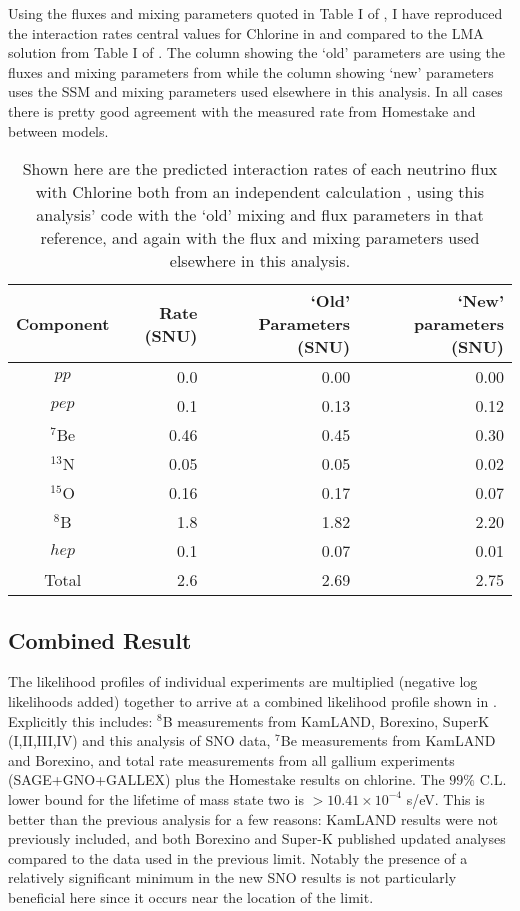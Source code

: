 Using the fluxes and mixing parameters quoted in Table I of \cite{bachall_lma}, I have reproduced the interaction rates central values for Chlorine in  and compared to the LMA solution from Table I of \cite{bachall_lma}.
The column showing the `old' parameters are using the fluxes and mixing parameters from \cite{bachall_lma} while the column showing `new' parameters uses the SSM and mixing parameters used elsewhere in this analysis.
In all cases there is pretty good agreement with the measured rate from Homestake and between models.

\begin{table}
\centering
\begin{tabular}{c|r|r|r}
Component & \cite{bachall_lma} Rate (SNU) & `Old' Parameters (SNU) & `New' parameters (SNU) \\ \hline
$pp$		& 0.0	&	0.00 & 0.00		\\
$pep$		& 0.1 	&	0.13 & 0.12		\\ 
$^7$Be		& 0.46	&	0.45 & 0.30		\\
$^{13}$N	& 0.05 	&	0.05 & 0.02		\\ 
$^{15}$O	& 0.16 	&	0.17 & 0.07		\\ 
$^8$B		& 1.8 	&	1.82 & 2.20		\\ 
$hep$		& 0.1 	&	0.07 & 0.01		\\ \hline
Total		& 2.6	&	2.69 & 2.75		\\ \hline
\end{tabular}
\caption{\label{tbl:chlorine}Shown here are the predicted interaction rates of each neutrino flux with Chlorine both from an independent calculation \cite{bachall_lma}, using this analysis' code with the `old' mixing and flux parameters in that reference, and again with the flux and mixing parameters used elsewhere in this analysis.}
\end{table}

\subsection{Combined Result}
\label{sec:combobreaker}

The likelihood profiles of individual experiments are multiplied (negative log likelihoods added) together to arrive at a combined likelihood profile shown in . 
Explicitly this includes: $^8$B measurements from KamLAND, Borexino, SuperK (I,II,III,IV) and this analysis of SNO data, $^7$Be measurements from KamLAND and Borexino, and total rate measurements from all gallium experiments (SAGE+GNO+GALLEX) plus the Homestake results on chlorine. 
The $99\%$ C.L. lower bound for the lifetime of mass state two is $>10.41\times10^{-4}$ s/eV. 
This is better than the previous analysis for a few reasons: KamLAND results were not previously included, and both Borexino and Super-K published updated analyses compared to the data used in the previous limit. 
Notably the presence of a relatively significant minimum in the new SNO results is not particularly beneficial here since it occurs near the location of the limit.

